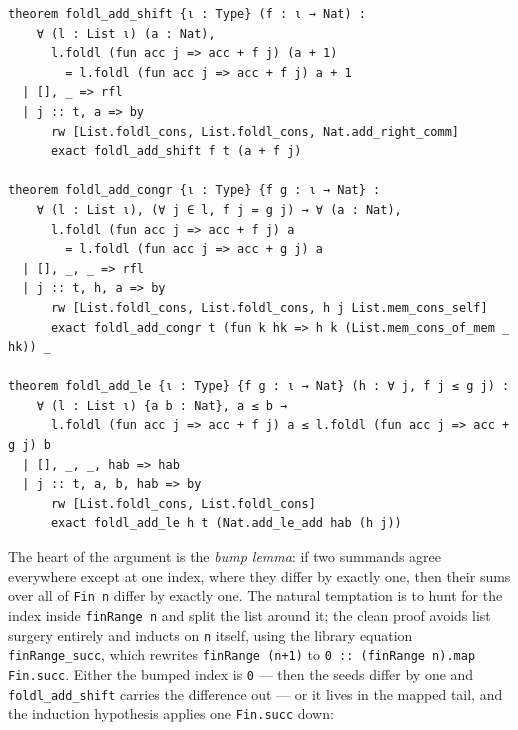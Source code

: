 \documentclass[12pt, a4paper, openright]{book}
\theoremstyle{thmstyle}
\theoremstyle{defstyle}
\newcommand{\lc}[1]{\texttt{#1}}
\begin{document}
\begin{verbatim}
theorem foldl_add_shift {ι : Type} (f : ι → Nat) :
    ∀ (l : List ι) (a : Nat),
      l.foldl (fun acc j => acc + f j) (a + 1)
        = l.foldl (fun acc j => acc + f j) a + 1
  | [], _ => rfl
  | j :: t, a => by
      rw [List.foldl_cons, List.foldl_cons, Nat.add_right_comm]
      exact foldl_add_shift f t (a + f j)

theorem foldl_add_congr {ι : Type} {f g : ι → Nat} :
    ∀ (l : List ι), (∀ j ∈ l, f j = g j) → ∀ (a : Nat),
      l.foldl (fun acc j => acc + f j) a
        = l.foldl (fun acc j => acc + g j) a
  | [], _, _ => rfl
  | j :: t, h, a => by
      rw [List.foldl_cons, List.foldl_cons, h j List.mem_cons_self]
      exact foldl_add_congr t (fun k hk => h k (List.mem_cons_of_mem _ hk)) _

theorem foldl_add_le {ι : Type} {f g : ι → Nat} (h : ∀ j, f j ≤ g j) :
    ∀ (l : List ι) {a b : Nat}, a ≤ b →
      l.foldl (fun acc j => acc + f j) a ≤ l.foldl (fun acc j => acc + g j) b
  | [], _, _, hab => hab
  | j :: t, a, b, hab => by
      rw [List.foldl_cons, List.foldl_cons]
      exact foldl_add_le h t (Nat.add_le_add hab (h j))
\end{verbatim}

The heart of the argument is the \emph{bump lemma}: if two summands agree
everywhere except at one index, where they differ by exactly one, then
their sums over all of \lc{Fin n} differ by exactly one. The natural
temptation is to hunt for the index inside \lc{finRange n} and split the
list around it; the clean proof avoids list surgery entirely and inducts
on \lc{n} itself, using the library equation
\lc{finRange_succ}, which rewrites \lc{finRange (n+1)} to \lc{0 :: (finRange n).map Fin.succ}.
Either the bumped index is \lc{0} --- then the seeds differ by one and
\lc{foldl_add_shift} carries the difference out --- or it lives in the
mapped tail, and the induction hypothesis applies one \lc{Fin.succ}
down:
\end{document}
